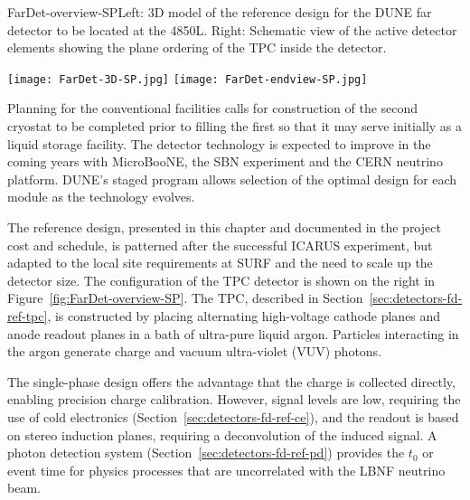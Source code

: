 \begin{cdrfigure}{FarDet-overview-SP}{Left: 3D model of the reference design for the DUNE far detector to be located at the 4850L. Right: Schematic view of the active detector elements showing the plane ordering of the TPC inside the detector.}
\centering
\begin{minipage}[b]{1.0\textwidth}
\begin{center}
\texttt{[image: FarDet-3D-SP.jpg]}
\texttt{[image: FarDet-endview-SP.jpg]}
\end{center}
\end{minipage}
\end{cdrfigure}
Planning for the conventional facilities calls for construction of the
second cryostat to be completed prior to filling the first so that it
may serve initially as a liquid storage facility.  The detector
technology is expected to improve in the coming years with MicroBooNE,
the SBN experiment  and the CERN neutrino platform. %
DUNE's staged program allows selection of the optimal design
for each module as the technology evolves.  %


The reference design, presented in this chapter and documented in the
project cost and schedule, is patterned after the successful ICARUS
experiment, but adapted to the local site requirements at SURF and the
need to scale up the detector size. 
The configuration of the TPC
detector is shown on the right in Figure~\ref{fig:FarDet-overview-SP}.
The TPC, described in Section~\ref{sec:detectors-fd-ref-tpc}, is
constructed by placing alternating high-voltage cathode planes and
anode readout planes in a bath of ultra-pure liquid argon. Particles
interacting in the argon generate charge and vacuum ultra-violet (VUV)
photons.


The single-phase design offers the advantage that the charge is
collected directly, enabling precision charge calibration. However,
signal levels are low, requiring the use of cold electronics
(Section~\ref{sec:detectors-fd-ref-ce}), and the readout is based on
stereo induction planes, requiring a deconvolution of the induced
signal. A photon detection system
(Section~\ref{sec:detectors-fd-ref-pd}) provides the $t_0$ or event
time for physics processes that are uncorrelated with the LBNF neutrino beam.
